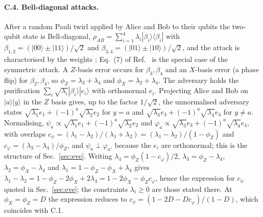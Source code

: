 \documentclass[aps,pra,twocolumn,superscriptaddress,nofootinbib]{revtex4-2}
\begin{document}
\paragraph*{C.4. Bell-diagonal attacks.} After a random Pauli twirl applied by Alice and Bob to their qubits the two-qubit state is Bell-diagonal, $\rho_{AB}=\sum_{i=1}^4\lambda_i|\beta_i\rangle\langle\beta_i|$ with $\beta_{1,2}=(|00\rangle\pm|11\rangle)/\sqrt2$ and $\beta_{3,4}=(|01\rangle\pm|10\rangle)/\sqrt2$, and the attack is characterised by the weights \cite{KGR05,RGK05}; Eq.~(7) of Ref.~\cite{GW99} is the special case of the symmetric attack. A $Z$-basis error occurs for $\beta_3,\beta_4$ and an $X$-basis error (a phase flip) for $\beta_2,\beta_4$, so $\phi_Z=\lambda_3+\lambda_4$ and $\phi_X=\lambda_2+\lambda_4$. The adversary holds the purification $\sum_i\sqrt{\lambda_i}|\beta_i\rangle|e_i\rangle$ with orthonormal $e_i$. Projecting Alice and Bob on $|a\rangle|y\rangle$ in the $Z$ basis gives, up to the factor $1/\sqrt2$, the unnormalised adversary states $\sqrt{\lambda_1}e_1+(-1)^a\sqrt{\lambda_2}e_2$ for $y=a$ and $\sqrt{\lambda_3}e_3+(-1)^a\sqrt{\lambda_4}e_4$ for $y\ne a$. Normalising, $\psi_a\propto\sqrt{\lambda_1}e_1+(-1)^a\sqrt{\lambda_2}e_2$ and $\varphi_a\propto\sqrt{\lambda_3}e_3+(-1)^a\sqrt{\lambda_4}e_4$, with overlaps $c_\psi=(\lambda_1-\lambda_2)/(\lambda_1+\lambda_2)=(\lambda_1-\lambda_2)/(1-\phi_Z)$ and $c_\varphi=(\lambda_3-\lambda_4)/\phi_Z$, and $\psi_a\perp\varphi_{a'}$ because the $e_i$ are orthonormal; this is the structure of Sec.~\ref{sec:eve}. Writing $\lambda_4=\phi_Z(1-c_\varphi)/2$, $\lambda_3=\phi_Z-\lambda_4$, $\lambda_2=\phi_X-\lambda_4$ and $\lambda_1=1-\phi_Z-\phi_X+\lambda_4$ gives $\lambda_1-\lambda_2=1-\phi_Z-2\phi_X+2\lambda_4=1-2\phi_X-\phi_Zc_\varphi$, hence the expression for $c_\psi$ quoted in Sec.~\ref{sec:eve}; the constraints $\lambda_i\ge0$ are those stated there. At $\phi_X=\phi_Z=D$ the expression reduces to $c_\psi=(1-2D-Dc_\varphi)/(1-D)$, which coincides with C.1.
\end{document}
